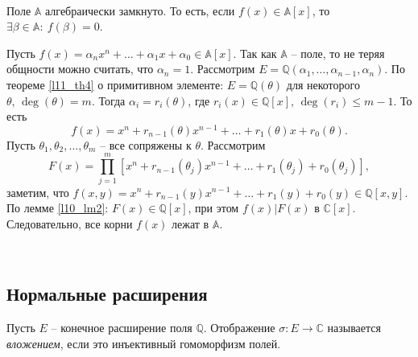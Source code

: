 \begin{theorem} \label{l12_th5}~\\
	Поле $\mathbb{A}$ алгебраически замкнуто. То есть, если $f(x) \in \mathbb{A}[x]$, то $\exists \beta \in \mathbb{A}: \ f(\beta) = 0$.
\end{theorem}
\begin{pf}
	Пусть $f(x) = \alpha_nx^n + \dots + \alpha_1x + \alpha_0 \in \mathbb{A}[x]$. Так как $\mathbb{A}$ -- поле, то не теряя общности можно считать, что $\alpha_n = 1$. Рассмотрим $E = \mathbb{Q}\left( \alpha_1, \dots, \alpha_{n-1}, \alpha_n \right)$. По теореме \ref{l11_th4} о примитивном элементе: $E = \mathbb{Q}(\theta)$ для некоторого $\theta, \, \deg(\theta)=m$. Тогда $\alpha_i = r_i(\theta)$, где $r_i(x) \in \mathbb{Q}[x], \, \deg(r_i) \leq m-1$. То есть
	$$f(x) = x^n + r_{n-1}(\theta) x^{n-1} + \dots + r_1(\theta)x + r_0(\theta).$$
	Пусть $\theta_1, \theta_2, \dots, \theta_m$ -- все сопряжены к $\theta$. Рассмотрим
	$$F(x) = \prod\limits_{j=1}^m \left[ x^n + r_{n-1}(\theta_j)x^{n-1} + \dots + r_1(\theta_j) + r_0(\theta_j) \right],$$
	заметим, что $f(x,y) = x^n + r_{n-1}(y)x^{n-1} + \dots + r_1(y) + r_0(y) \in \mathbb{Q}[x,y]$. По лемме \ref{l10_lm2}:
	$F(x) \in \mathbb{Q}[x]$, при этом $f(x) \vert F(x)$ в $\mathbb{C}[x]$.
	Следовательно, все корни $f(x)$ лежат в $\mathbb{A}$.
\end{pf}~\\

\subsection{Нормальные расширения}
\begin{definition}
	Пусть $E$ -- конечное расширение поля $\mathbb{Q}$. Отображение $\sigma\colon E \to \mathbb{C}$ называется \textit{вложением}, если это инъективный гомоморфизм полей.
\end{definition}

